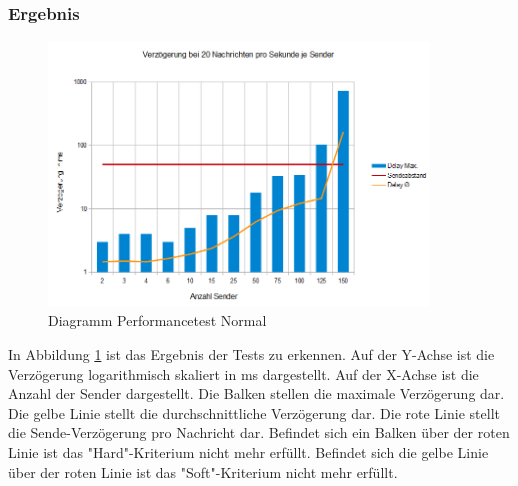 \subsubsection{Ergebnis}
\begin{figure}[htH]
\centering
\includegraphics[width=0.9\textwidth]{backend/Diagramm_Performance_Normal.PNG}
\caption{Diagramm Performancetest Normal}
\label{backfig14}
\end{figure}
In Abbildung \ref{backfig14} ist das Ergebnis der Tests zu erkennen. 
Auf der Y-Achse ist die Verzögerung logarithmisch skaliert in ms dargestellt.
Auf der X-Achse ist die Anzahl der Sender dargestellt.
Die Balken stellen die maximale Verzögerung dar. 
Die gelbe Linie stellt die durchschnittliche Verzögerung dar.
Die rote Linie stellt die Sende-Verzögerung pro Nachricht dar.
Befindet sich ein Balken über der roten Linie ist das "Hard"-Kriterium nicht mehr erfüllt.
Befindet sich die gelbe Linie über der roten Linie ist das "Soft"-Kriterium nicht mehr erfüllt.



